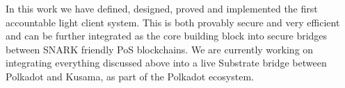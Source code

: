 In this work we have defined, designed, proved and implemented the first accountable light client system. This is both provably secure and 
very efficient and can be further integrated as the core building block into secure bridges between SNARK friendly PoS blockchains. We are 
currently working on integrating everything discussed above into a live Substrate bridge between Polkadot and Kusama, as part of the Polkadot ecosystem.
